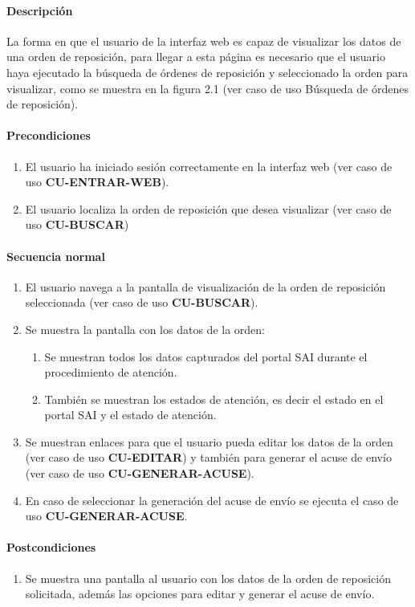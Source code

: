 \paragraph{Descripción}
La forma en que el usuario de la interfaz web es capaz de visualizar los datos de una orden de reposición, para llegar a esta página es necesario que el usuario haya ejecutado la búsqueda de órdenes de reposición y seleccionado la orden para visualizar, como se muestra en la figura 2.1 (ver caso de uso Búsqueda de órdenes de reposición).
\paragraph{Precondiciones}
\begin{enumerate}
  \item El usuario ha iniciado sesión correctamente en la interfaz web (ver caso de uso \textbf{CU-ENTRAR-WEB}).
  \item El usuario localiza la orden de reposición que desea visualizar (ver caso de uso \textbf{CU-BUSCAR})
\end{enumerate}
\paragraph{Secuencia normal}
\begin{enumerate}
  \item El usuario navega a la pantalla de visualización de la orden de reposición seleccionada (ver caso de uso \textbf{CU-BUSCAR}).
  \item Se muestra la pantalla con los datos de la orden:
  \begin{enumerate}
    \item Se muestran todos los datos capturados del portal SAI durante el procedimiento de atención.
    \item También se muestran los estados de atención, es decir el estado en el portal SAI  y el estado de atención.
  \end{enumerate}
  \item Se muestran enlaces para que el usuario pueda editar los datos de la orden (ver caso de uso \textbf{CU-EDITAR}) y también para generar el acuse de envío (ver caso de uso \textbf{CU-GENERAR-ACUSE}).
  \item En caso de seleccionar la generación del acuse de envío se ejecuta el caso de uso \textbf{CU-GENERAR-ACUSE}.
\end{enumerate}
\paragraph{Postcondiciones}
\begin{enumerate}
  \item Se muestra una pantalla al usuario con los datos de la orden de reposición solicitada, además las opciones para editar y generar el acuse de envío.
\end{enumerate}

